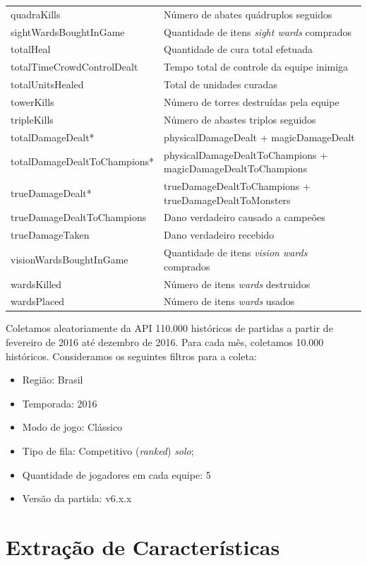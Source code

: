 \begin{table}
\begin{tabular}{p{}p{}}
quadraKills & Número de abates quádruplos seguidos\\
sightWardsBoughtInGame & Quantidade de itens \textit{sight wards} comprados\\
totalHeal & Quantidade de cura total efetuada\\
totalTimeCrowdControlDealt & Tempo total de controle da equipe inimiga\\
totalUnitsHealed & Total de unidades curadas\\
towerKills & Número de torres destruídas pela equipe\\
tripleKills & Número de abastes triplos seguidos\\
totalDamageDealt* & physicalDamageDealt + magicDamageDealt \\
totalDamageDealtToChampions* & physicalDamageDealtToChampions + magicDamageDealtToChampions \\
 trueDamageDealt* & trueDamageDealtToChampions + trueDamageDealtToMonsters\\
trueDamageDealtToChampions & Dano verdadeiro causado a campeões\\
trueDamageTaken & Dano verdadeiro recebido\\
visionWardsBoughtInGame & Quantidade de itens \textit{vision wards} comprados\\
wardsKilled & Número de itens \textit{wards} destruidos\\
wardsPlaced & Número de itens \textit{wards} usados\\
  \bottomrule
\end{tabular}
\end{table}

Coletamos aleatoriamente da API 110.000 históricos de partidas a partir de fevereiro de 2016 até dezembro de 2016. Para cada mês, coletamos 10.000 históricos. Consideramos os seguintes filtros para a coleta: 

\begin{itemize}
  \item Região: Brasil
  \item Temporada: 2016
  \item Modo de jogo: Clássico
  \item Tipo de fila: Competitivo (\textit{ranked}) \textit{solo};
  \item Quantidade de jogadores em cada equipe: 5
  \item Versão da partida: v6.x.x
\end{itemize}

\section{Extração de Características}

